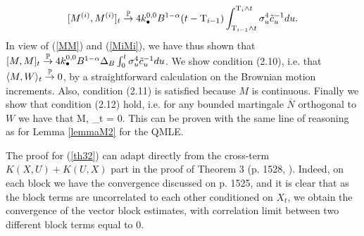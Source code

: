 \documentclass[11pt]{article}
\numberwithin{equation}{section}
\newcommand{\Tau}{\mathrm{T}}
\theoremstyle{plain}
\theoremstyle{remark}
\begin{document}
\begin{eqnarray}
\label{MiMi}
[M^{(i)}, M^{(i)}]_{t} \overset{\proba}{\rightarrow} 4 k_{\bullet}^{0,0} B^{1 - \alpha} (t - \Tau_{i-1}) \int_{\Tau_{i-1} \wedge t}^{\Tau_{i} \wedge t} \sigma_u^4 \tilde{c}_u^{-1} du.
\end{eqnarray}
In view of (\ref{MM}) and (\ref{MiMi}), we have thus shown that $[M, M]_t \overset{\mathbb{P}}{\rightarrow} 4 k_{\bullet}^{0,0} B^{1 - \alpha} \Delta_B \int_0^t \sigma_u^4 \tilde{c}_u^{-1} du$.
We show condition (2.10), i.e. that $\langle M, W \rangle_t \overset{\mathbb{P}}{\rightarrow} 0$,
by a straightforward calculation on the Brownian motion increments.
Also, condition (2.11) is satisfied because $M$ is continuous. Finally we show that condition (2.12) hold, i.e. for any bounded martingale $\overline{N}$ orthogonal to $W$ we have that 
\bea 
\langle M,  \rangle_t = 0.
\eea 
This can be proven with the same line of reasoning as for Lemma \ref{lemmaM2} for the QMLE.

\smallskip
The proof for (\ref{th32}) can adapt directly from the cross-term $K(X,U) + K(U,X)$ part in the proof of Theorem 3 (p. 1528, \cite{barndorff2008designing}). Indeed, on each block we have the convergence discussed on p. 1525, and it is clear that as the block terms are uncorrelated to each other conditioned on $X_t$, we obtain the convergence of the vector block estimates, with correlation limit between two different block terms equal to 0.
\end{document}

